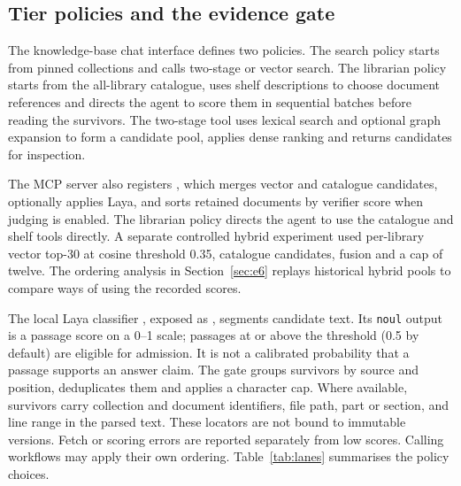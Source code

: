 \subsection{Tier policies and the evidence gate}
\label{sec:trace}
\label{sec:gate}
\label{sec:gate-primitive}
\label{sec:twostage}

The knowledge-base chat interface defines two policies. The search policy
starts from pinned collections and calls two-stage or vector search. The
librarian policy starts from the all-library catalogue, uses shelf
descriptions to choose document references and directs the agent to score
them in sequential batches before reading the survivors. The two-stage
tool uses lexical search and optional graph expansion to form a candidate
pool, applies dense ranking and returns candidates for inspection.

The MCP server also registers , which merges vector
and catalogue candidates, optionally applies Laya, and sorts retained
documents by verifier score when judging is enabled. The librarian policy
directs the agent to use the catalogue and shelf tools directly. A separate
controlled hybrid experiment used per-library vector top-30 at cosine
threshold 0.35, catalogue candidates, fusion and a cap of twelve. The
ordering analysis in Section~\ref{sec:e6} replays historical hybrid pools
to compare ways of using the recorded scores.

The local Laya classifier \cite{laya}, exposed as ,
segments candidate text. Its \texttt{noul} output is a passage score on a
0--1 scale; passages at or above the threshold (0.5 by default) are eligible
for admission. It is not a calibrated probability that a passage supports
an answer claim. The gate groups survivors by source and position,
deduplicates them and applies a character cap. Where available, survivors
carry collection and document identifiers, file path, part or section, and
line range in the parsed text. These locators are not bound to immutable
versions. Fetch or scoring errors are reported separately from low scores.
Calling workflows may apply their own ordering. Table~\ref{tab:lanes}
summarises the policy choices.

